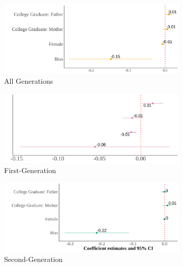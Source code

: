 \documentclass[12pt,english]{article}
\begin{document}
\begin{center}
\begin{figure}[!htb]
\centering
\caption{Relationship Between Self-Reported Asian Identity and Bias: By Generation County}
\label{plot01-regression-gen}
\begin{subfigure}{.48\textwidth}
\caption{All Generations}
\centering
\includegraphics[width=.9\linewidth]{figure/county-skin-iat-regression-all-gens.png}
\end{subfigure}
\centering
\begin{subfigure}{.48\textwidth}
\caption{First-Generation}
\centering
\includegraphics[width=.9\linewidth]{figure/county-skin-iat-regression-first-gen.png}
\end{subfigure}
\begin{subfigure}{.48\textwidth}
\caption{Second-Generation}
\centering
\includegraphics[width=.9\linewidth]{figure/county-skin-iat-regression-second-gen.png}
\end{subfigure}
\begin{subfigure}{.48\textwidth}

\end{subfigure}
\end{figure}
\end{center}
\end{document}
